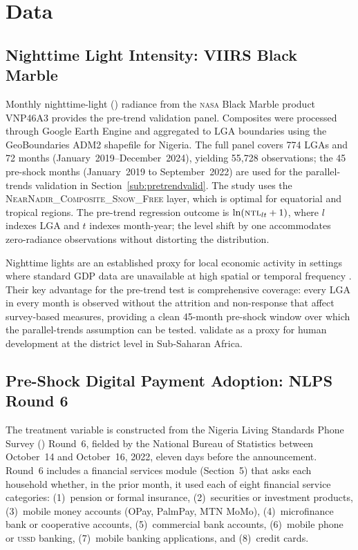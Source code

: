 
\section{Data}
\label{sec:data}

\subsection{Nighttime Light Intensity: VIIRS Black Marble}
\label{sub:viirs}

Monthly nighttime-light (\NTL) radiance from the \textsc{nasa} Black Marble
product VNP46A3 \citep{donaldson2016view} provides the pre-trend validation
panel. Composites were processed through Google Earth Engine and aggregated
to LGA boundaries using the GeoBoundaries ADM2 shapefile for Nigeria. The
full panel covers 774 LGAs and 72 months (January~2019--December~2024),
yielding 55,728 observations; the 45 pre-shock months (January~2019 to
September~2022) are used for the parallel-trends validation in
Section~\ref{sub:pretrendvalid}. The study uses the
\textsc{NearNadir\_Composite\_Snow\_Free} layer, which is optimal for
equatorial and tropical regions. The pre-trend regression outcome is
$\ln(\textsc{ntl}_{lt} + 1)$, where $l$ indexes LGA and $t$ indexes month-year;
the level shift by one accommodates zero-radiance observations without
distorting the distribution.

Nighttime lights are an established proxy for local economic activity in
settings where standard GDP data are unavailable at high spatial or temporal
frequency \citep{henderson2012measuring,gibson2020night}. Their key advantage
for the pre-trend test is comprehensive coverage: every LGA in every month is
observed without the attrition and non-response that affect survey-based
measures, providing a clean 45-month pre-shock window over which the
parallel-trends assumption can be tested.
\citet{bruederle2019nighttime} validate \NTL{} as a proxy
for human development at the district level in Sub-Saharan Africa.

\subsection{Pre-Shock Digital Payment Adoption: NLPS Round 6}
\label{sub:fintech}

The treatment variable is constructed from the Nigeria Living Standards
Phone Survey (\NLPS) Round~6, fielded by the National Bureau of Statistics
between October~14 and October~16, 2022, eleven days before the \CBN{}
announcement. Round~6 includes a financial services module (Section~5) that
asks each household whether, in the prior month, it used each of eight
financial service categories: (1)~pension or formal insurance, (2)~securities
or investment products, (3)~mobile money accounts (OPay, PalmPay, MTN
MoMo), (4)~microfinance bank or cooperative accounts, (5)~commercial bank
accounts, (6)~mobile phone or \textsc{ussd} banking, (7)~mobile banking
applications, and (8)~credit cards.

